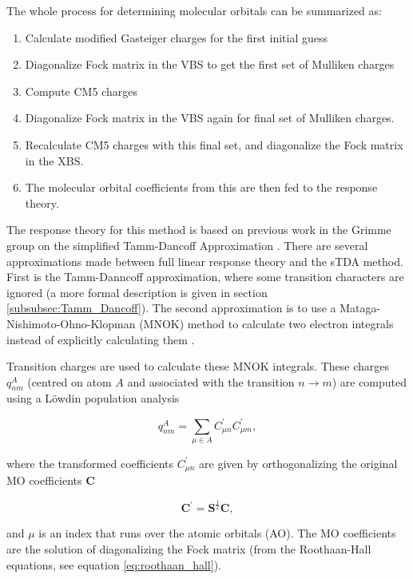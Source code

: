 The whole process for determining molecular orbitals can be summarized as:
\begin{enumerate}
	\item Calculate modified Gasteiger charges for the first initial guess
	\item Diagonalize Fock matrix in the VBS to get the first set of Mulliken charges
	\item Compute CM5 charges
	\item Diagonalize Fock matrix in the VBS again for final set of Mulliken charges.
	\item Recalculate CM5 charges with this final set, and diagonalize the Fock matrix in the XBS. 
	\item The molecular orbital coefficients from this are then fed to the response theory.
\end{enumerate}

The response theory for this method is based on previous work in the Grimme group
on the simplified Tamm-Dancoff Approximation \cite{Grimme2013}. There are several
approximations made between full linear response theory and the sTDA method. First
is the Tamm-Danncoff approximation, where some transition characters are ignored
(a more formal description is given in section \ref{subsubsec:Tamm_Dancoff}). The
second approximation is to use a Mataga-Nishimoto-Ohno-Klopman (MNOK) method to 
calculate two electron integrals instead of explicitly calculating them \cite{Nishimoto1957, Ohno1964, Klopman1964}.

Transition charges are used to calculate these MNOK integrals. These charges $q^A_{nm}$
(centred on atom $A$ and associated with the transition $ n \rightarrow m$) are
computed using a Löwdin population analysis

\begin{equation}
q_{nm}^A = \sum_{\mu \in A} C^\prime_{\mu n} C^\prime_{\mu m},
\end{equation}

where the transformed coefficients $C^\prime_{\mu n}$ are given by orthogonalizing
the original MO coefficients $\textbf{C}$

\begin{equation}
\textbf{C}^\prime = \textbf{S}^{\frac{1}{2}} \textbf{C},
\end{equation}

and $\mu$ is an index that runs over the atomic orbitals (AO). The MO coefficients
are the solution of diagonalizing the Fock matrix (from the Roothaan-Hall equations,
see equation \ref{eq:roothaan_hall}).

